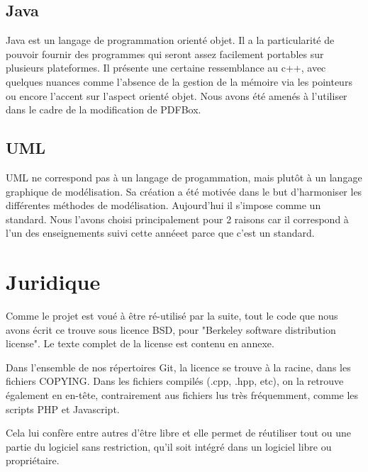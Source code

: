         \subsection{Java}
Java est un langage de programmation orienté objet. Il a la particularité de 
pouvoir fournir des programmes qui seront assez facilement portables sur plusieurs 
plateformes. Il présente une certaine ressemblance au c++, avec quelques nuances 
comme l'absence de la gestion de la mémoire via les pointeurs ou encore l'accent 
sur l'aspect orienté objet. Nous avons été amenés à l'utiliser dans le cadre de 
la modification de PDFBox. 


       \subsection{UML}
UML ne correspond pas à un langage de progammation, mais plutôt à un langage 
graphique de modélisation. Sa création a été motivée dans le but d'harmoniser les
différentes méthodes de modélisation. Aujourd'hui il s'impose comme un standard. 
Nous l'avons choisi principalement pour 2 raisons car il correspond à l'un des 
enseignements suivi cette annéeet parce que c'est un standard.



    \section{Juridique}
Comme le projet est voué à être ré-utilisé par la suite, tout le code que nous 
avons écrit ce trouve sous licence BSD, pour "Berkeley software distribution
license". Le texte complet de la license est contenu en annexe.

Dans l'ensemble de nos répertoires Git, la licence se trouve à la racine, dans les
fichiers COPYING. Dans les fichiers compilés (.cpp, .hpp, etc), on la retrouve
également en en-tête, contrairement aus fichiers lus très fréquemment, comme les
scripts PHP et Javascript.

Cela lui confère entre autres d'être libre et elle permet de réutiliser tout ou 
une partie du logiciel sans restriction, qu'il soit intégré dans un logiciel libre 
ou propriétaire.

